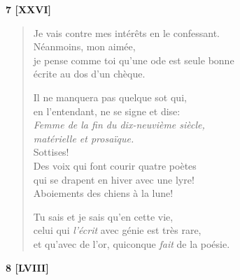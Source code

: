 

\bigskip



\begin{center}
  \textbf{7 [XXVI]}
\end{center}

\begin{verse}
  Je vais contre mes intérêts en le confessant. \\
  Néanmoins, mon aimée, \\
  je pense comme toi qu'une ode est seule bonne \\
  écrite au dos d'un chèque.

  Il ne manquera pas quelque sot qui, \\
  en l'entendant, ne se signe et dise: \\
  \emph{Femme de la fin du dix-neuvième siècle, \\
    matérielle et prosaïque.} \\
  Sottises! \\
  Des voix qui font courir quatre poètes \\
  qui se drapent en hiver avec une lyre! \\
  Aboiements des chiens à la lune!

  Tu sais et je sais qu'en cette vie, \\
  celui qui \emph{l'écrit} avec génie est très rare, \\
  et qu'avec de l'or, quiconque \emph{fait} de la poésie.
\end{verse}

\bigskip

\begin{center}
  \textbf{8 [LVIII]}
\end{center}

